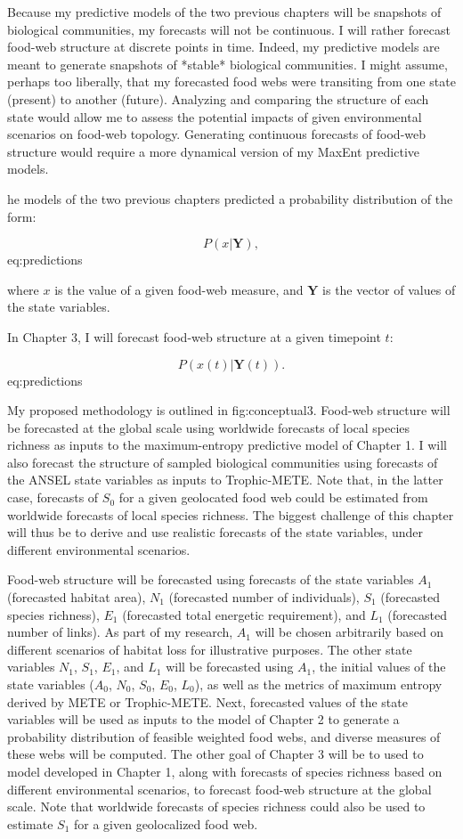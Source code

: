 Because my predictive models of the two previous chapters will be snapshots of
biological communities, my forecasts will not be continuous. I will rather
forecast food-web structure at discrete points in time. Indeed, my predictive
models are meant to generate snapshots of *stable* biological communities. I
might assume, perhaps too liberally, that my forecasted food webs were
transiting from one state (present) to another (future). Analyzing and comparing
the structure of each state would allow me to assess the potential impacts of
given environmental scenarios on food-web topology. Generating continuous
forecasts of food-web structure would require a more dynamical version of my
MaxEnt predictive models.

he models of the two previous chapters predicted a probability distribution of
the form:

$$P(x|\textbf{Y}),$${eq:predictions}

where $x$ is the value of a given food-web measure, and $\textbf{Y}$ is the
vector of values of the state variables.

In Chapter 3, I will forecast food-web structure at a given timepoint $t$:

$$P(x(t)|\textbf{Y}(t)).$${eq:predictions}

My proposed methodology is outlined in fig:conceptual3. Food-web structure will
be forecasted at the global scale using worldwide forecasts of local species
richness as inputs to the maximum-entropy predictive model of Chapter 1. I will
also forecast the structure of sampled biological communities using forecasts of
the ANSEL state variables as inputs to Trophic-METE. Note that, in the latter
case, forecasts of $S_0$ for a given geolocated food web could be estimated from
worldwide forecasts of local species richness. The biggest challenge of this
chapter will thus be to derive and use realistic forecasts of the state
variables, under different environmental scenarios.

Food-web structure will be forecasted using forecasts of the
state variables $A_1$ (forecasted habitat area), $N_1$ (forecasted
number of individuals), $S_1$ (forecasted species richness), $E_1$
(forecasted total energetic requirement), and $L_1$ (forecasted number
of links). As part of my research, $A_1$ will be chosen arbitrarily
based on different scenarios of habitat loss for illustrative purposes.
The other state variables $N_1$, $S_1$, $E_1$, and $L_1$ will be
forecasted using $A_1$, the initial values of the state variables
($A_0$, $N_0$, $S_0$, $E_0$, $L_0$), as well as the metrics of maximum
entropy derived by METE or Trophic-METE. Next, forecasted values of the
state variables will be used as inputs to the model of Chapter 2 to
generate a probability distribution of feasible weighted food webs, and
diverse measures of these webs will be computed. The other goal of
Chapter 3 will be to used to model developed in Chapter 1, along with
forecasts of species richness based on different environmental
scenarios, to forecast food-web structure at the global scale. Note that
worldwide forecasts of species richness could also be used to estimate
$S_1$ for a given geolocalized food web.

